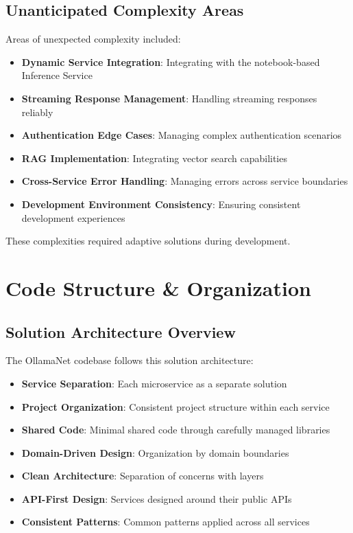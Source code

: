 \subsection{Unanticipated Complexity Areas}
Areas of unexpected complexity included:
\begin{itemize}
    \item \textbf{Dynamic Service Integration}: Integrating with the notebook-based Inference Service
    \item \textbf{Streaming Response Management}: Handling streaming responses reliably
    \item \textbf{Authentication Edge Cases}: Managing complex authentication scenarios
    \item \textbf{RAG Implementation}: Integrating vector search capabilities
    \item \textbf{Cross-Service Error Handling}: Managing errors across service boundaries
    \item \textbf{Development Environment Consistency}: Ensuring consistent development experiences
\end{itemize}

These complexities required adaptive solutions during development.

\section{Code Structure \& Organization}

\subsection{Solution Architecture Overview}
The OllamaNet codebase follows this solution architecture:
\begin{itemize}
    \item \textbf{Service Separation}: Each microservice as a separate solution
    \item \textbf{Project Organization}: Consistent project structure within each service
    \item \textbf{Shared Code}: Minimal shared code through carefully managed libraries
    \item \textbf{Domain-Driven Design}: Organization by domain boundaries
    \item \textbf{Clean Architecture}: Separation of concerns with layers
    \item \textbf{API-First Design}: Services designed around their public APIs
    \item \textbf{Consistent Patterns}: Common patterns applied across all services
\end{itemize}

